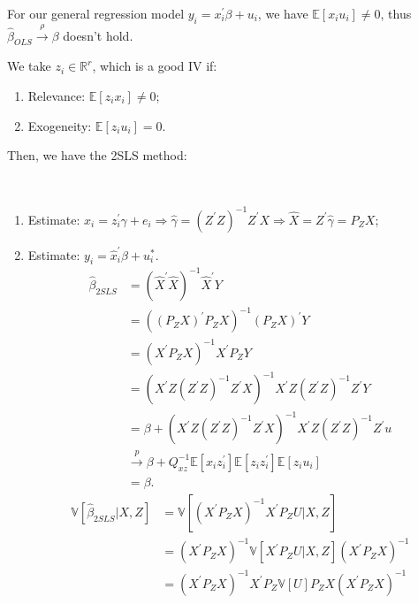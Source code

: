 For our general regression model $y_i = x_i^{\prime} \beta + u_i$, we have $\mathbb{E}[x_i u_i] \neq 0$,
thus $\hat{\beta}_{OLS} \overset{\rho}{\rightarrow} \beta$ doesn't hold.

We take $z_i \in \mathbb{R}^r$, which is a good IV if:
\begin{enumerate}
    \item Relevance: $\mathbb{E}[z_i x_i] \neq 0$;
    \item Exogeneity: $\mathbb{E}[z_i u_i] = 0$.
\end{enumerate}

Then, we have the 2SLS method:
\begin{definition}
    \ 
    \begin{enumerate}
        \item Estimate: $x_i = z_i^{\prime} \gamma + e_i \Rightarrow \hat{\gamma} = (Z^{\prime} Z)^{-1}Z^{\prime} X \Rightarrow \hat{X} = Z^{\prime} \hat{\gamma} = P_Z X$;
        \item Estimate: $y_i = \hat{x}_i^{\prime} \beta + u_i^*$.
        \begin{align*}
            \hat{\beta}_{2SLS} &= (\hat{X}^{\prime} \hat{X})^{-1}\hat{X}^{\prime} Y \\ 
            &= \left((P_Z X)^{\prime} P_Z X\right)^{-1} (P_Z X)^{\prime} Y \\ 
            &= (X^{\prime} P_Z X)^{-1} X^{\prime} P_Z Y \\
            &= \left(X^{\prime} Z (Z^{\prime} Z)^{-1} Z^{\prime} X\right)^{-1} X^{\prime} Z (Z^{\prime} Z)^{-1} Z^{\prime} Y \\ 
            &= \beta + \left(X^{\prime} Z (Z^{\prime} Z)^{-1} Z^{\prime} X\right)^{-1} X^{\prime} Z (Z^{\prime} Z)^{-1} Z^{\prime} u \\ 
            &\overset{p}{\rightarrow} \beta + Q_{xz}^{-1} \mathbb{E}[x_i z_i^{\prime}] \mathbb{E}[z_i z_i^{\prime}] \mathbb{E}[z_i u_i]\\ 
            &= \beta.
        \end{align*}
        \begin{align*}
            \mathbb{V}[\hat{\beta}_{2SLS} | X, Z] &= \mathbb{V}\left[\left(X^{\prime} P_Z X \right)^{-1} X^{\prime} P_Z U | X, Z \right] \\
            &= \left(X^{\prime} P_Z X \right)^{-1} \mathbb{V}\left[X^{\prime} P_Z U | X, Z \right] \left(X^{\prime} P_Z X \right)^{-1} \\
            &= \left(X^{\prime} P_Z X \right)^{-1} X^{\prime} P_Z \mathbb{V}[U] P_Z X \left(X^{\prime} P_Z X \right)^{-1}\\

\end{align*}
\end{enumerate}
\end{definition}
